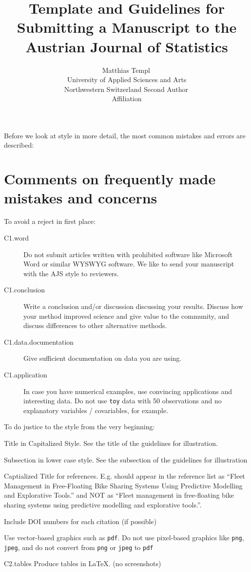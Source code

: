\documentclass[article]{ajs}
\author{Matthias Templ\,\orcidlink{0000-0002-8638-5276}\\ University of Applied Sciences and Arts \\ Northwestern Switzerland \And 
        Second Author\,\orcidlink{0000-0000-0000-0000}\\ Affiliation}
\title{Template and Guidelines for Submitting a Manuscript to the Austrian Journal of Statistics}
\begin{document}

Before we look at style in more detail, the most common mistakes and errors are described:

\section{Comments on frequently made mistakes and concerns}

To avoid a reject in first place:

\begin{description}
\item[C1.word] Do not submit articles written with prohibited software like Microsoft Word or similar WYSWYG software. We like to send your manuscript with the AJS style to reviewers. 
\item[C1.conclusion] Write a conclusion and/or discussion discussing your results.  Discuss how your method improved science and give value to the community, and discuss differences to other alternative methods. 
\item[C1.data.documentation] Give sufficient documentation on data you are using.
\item[C1.application] In case you have numerical examples, use convincing applications and interesting data. Do not use \texttt{toy} data with 50 observations and no explanatory variables / covariables, for example. 
\end{description}

To do justice to the style from the very beginning:

\begin{description}
\item[C2.title] Title in Capitalized Style. See the title of the guidelines for illustration.
\item[C2.subsections]  Subsection in lower case style. See the subsection of the guidelines for illustration
\item[C2.references]  Captialized Title for references. E.g. \cite{fleet20} should appear in the reference list as ``Fleet Management in Free-Floating Bike Sharing Systems Using
  Predictive Modelling and Explorative Tools.'' and NOT as ``Fleet management in free-floating bike sharing systems using
  predictive modelling and explorative tools.''.
\item[C2.doi]  Include DOI numbers for each citation (if possible)
\item[C2.graphics]  Use vector-based graphics such as \texttt{pdf}. Do not use pixel-based graphics like \texttt{png}, \texttt{jpeg}, and do not convert from \texttt{png} or \texttt{jpeg} to \texttt{pdf}
\item{C2.tables} Produce tables in \LaTeX{}. (no screenshots)
\end{description}
\end{document}
